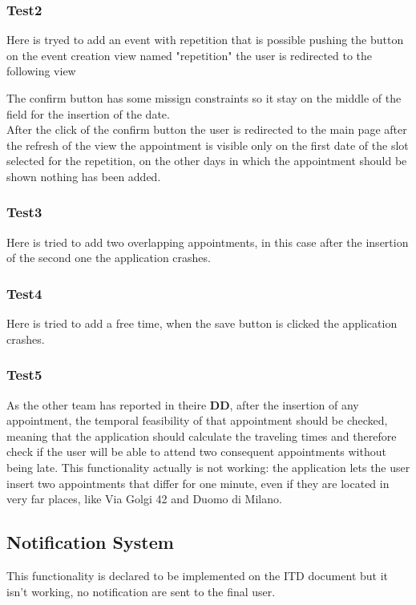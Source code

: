 \subsubsection{Test2}
Here is tryed to add an event with repetition that is possible pushing the button on the event creation view named "repetition" the user is redirected to the following view


The confirm button has some missign constraints so it stay on the middle of the field for the insertion of the date.\\
After the click of the confirm button the user is redirected to the main page after the refresh of the view the appointment is visible only on the first date of the slot selected for the repetition, on the other days in which the appointment should be shown nothing has been added.

\subsubsection{Test3}
Here is tried to add two overlapping appointments, in this case after the insertion of the second one the application crashes.

\subsubsection{Test4}
Here is tried to add a free time, when the save button is clicked the application crashes.

\subsubsection{Test5}
As the other team has reported in theire \textbf{DD}, after the insertion of any appointment, the temporal feasibility of that appointment should be checked, meaning that the application should calculate the traveling times and therefore check if the user will be able to attend two consequent appointments without being late.
This functionality actually is not working: the application lets the user insert two appointments that differ for one minute, even if they are located in very far places, like Via Golgi 42 and Duomo di Milano.


\subsection{Notification System}
This functionality is declared to be implemented on the ITD document but it isn't working, no notification are sent to the final user.

